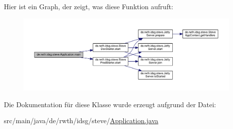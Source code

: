 Hier ist ein Graph, der zeigt, was diese Funktion aufruft\+:\nopagebreak
\begin{figure}[H]
\begin{center}
\leavevmode
\includegraphics[width=350pt]{classde_1_1rwth_1_1idsg_1_1steve_1_1_application_aa3e1a59b80a7340d91e71701cb2b282a_cgraph}
\end{center}
\end{figure}




Die Dokumentation für diese Klasse wurde erzeugt aufgrund der Datei\+:\begin{DoxyCompactItemize}
\item 
src/main/java/de/rwth/idsg/steve/\hyperlink{_application_8java}{Application.\+java}\end{DoxyCompactItemize}
